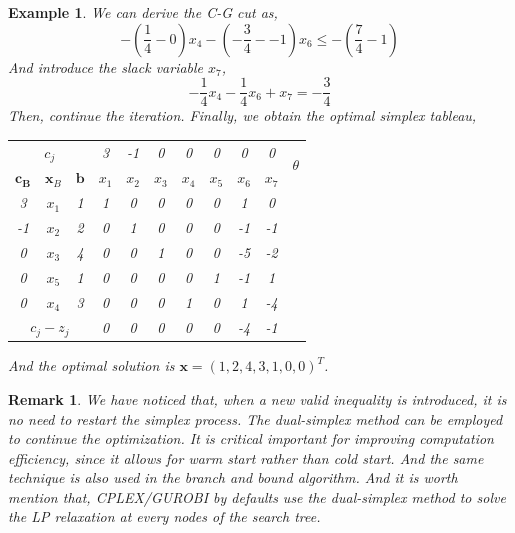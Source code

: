 \documentclass{article}
\newtheorem{example}{Example}
\newtheorem{remark}{Remark}
\begin{document}
\begin{example}
  	We can derive the C-G cut as,
  	\begin{equation}
  		-(\frac{1}{4} - 0)x_4 - (-\frac{3}{4} - -1)x_6 \leq -(\frac{7}{4} - 1)
  	\end{equation}
  	And introduce the slack variable $x_7$,
  	\begin{equation}
  		-\frac{1}{4} x_4 - \frac{1}{4}x_6 + x_7 = -\frac{3}{4}
  	\end{equation}
   Then, continue the iteration. Finally, we obtain the optimal simplex tableau,
   	\begin{table}[htbp]
	   	\centering
	   	\begin{tabular}{@{}ccccccccccc@{}}
	   		\toprule
	   		\multicolumn{3}{c}{$c_j$}      & 3       & -1    & 0    & 0    & 0      &  0     &  0   & \multirow{2}{*}{$\theta$} \\ \cmidrule(r){1-10}
	   		$\bm{c_B}$     & $\bm{x}_B$     & $\bm{b}$       & $x_1$    & $x_2$ & $x_3$ & $x_4$ & $x_5$ & $x_6$ &     $x_7$  &           \\ \midrule
	   		3        & $x_1$     & 1      & 1         & 0      & 0    & 0        & 0     &   1       &      0      &        \\
	   		-1        & $x_2$     & 2      & 0        & 1      & 0    & 0    & 0     &  -1  &    -1     &         \\
	   		0        & $x_3$     & 4       & 0       & 0      & 1    & 0    & 0     &  -5   &    -2    &          \\ 
	   		0       & $x_5$      &  1         &   0   &  0    & 0     & 0    & 1     &   -1   &    1    &    \\
	   		0       &  $x_4$      &  3       &   0    & 0     &  0    &    1      &   0    &  1     &   -4    &    \\ \midrule
	   		\multicolumn{3}{c}{$c_j-z_j$} & 0       & 0    & 0    & 0    & 0   &  -4   &     -1    &        \\  \bottomrule
	   	\end{tabular}%
   \end{table}

	And the optimal solution is $\bm{x} = (1, 2, 4, 3, 1, 0, 0)^T$.
\end{example}


\begin{remark}
	We have noticed that, when a new valid inequality is introduced, it is no need to restart the simplex process. The dual-simplex method can be employed to continue the optimization. It is critical important for improving computation efficiency, since it allows for warm start rather than cold start. And the same technique is also used in the branch and bound algorithm. And it is worth mention that, CPLEX/GUROBI by defaults use the dual-simplex method to solve the LP relaxation at every nodes of the search tree.
\end{remark}
\end{document}
